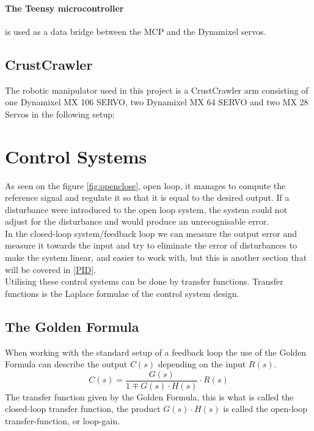 \paragraph{The Teensy microcontroller} is used as a data bridge between the MCP and the Dynamixel servos.
\subsection{CrustCrawler}
The robotic manipulator used in this project is a CrustCrawler arm consisting of one Dynamixel MX 106 SERVO, two Dynamixel MX 64 SERVO and two MX 28 Servos in the following setup:

\section{Control Systems}

As seen on the figure \ref{fig:openclose}, open loop, it manages to compute the reference signal and regulate it so that it is equal to the desired output. If a  disturbance were introduced to the open loop system, the system could not adjust for the disturbance and would produce an unrecognisable error.\\
In the closed-loop system/feedback loop we can measure the output error and measure it towards the input and try to eliminate the error of disturbances to make the system linear, and easier to work with, but this is another section that will be covered in \ref{PID}.\\ 
Utilising these control systems can be done by transfer functions. Transfer functions is the Laplace formulae of the control system design.\\

\subsection{The Golden Formula}

When working with the standard setup of a feedback loop the use of the Golden Formula can describe the output $C(s)$ depending on the input $R(s)$.
\begin{equation}\label{eq:GoldenFormula}
    C(s)=\frac{G(s)}{1\mp G(s)\cdot H(s)}\cdot R(s)
\end{equation}
The transfer function given by the Golden Formula, this is what is called the closed-loop transfer function, the product $G(s)\cdot H(s)$ is called the open-loop transfer-function, or loop-gain.



